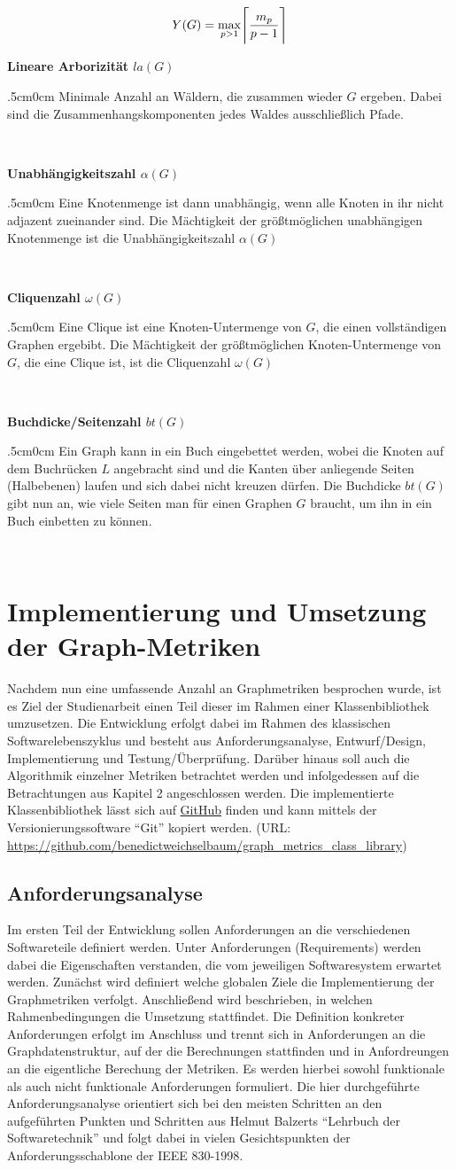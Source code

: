 \documentclass[a4paper,12pt,ngerman,chapterprefix=false,listof=totoc,bibliography=totoc]{scrreprt}
\makeatletter
\DeclarePairedDelimiter{\ceil}{\lceil}{\rceil}
\newcommand{\specialcell}[2][l]{%
  \begin{tabular}[#1]{@{}l@{}}#2\end{tabular}}
\newcommand{\metric}[2]{
	\textbf{#1}
	\begin{adjustwidth}{.5cm}{0cm}
		#2
	\end{adjustwidth}\hrulefill\\\vspace{2mm}
}
\makeatother
\begin{document}
{{{\[Y(G)=\max_{p>1}\ceil[\Bigg]{\frac{m_p}{p-1}}\]
}
\metric{Lineare Arborizität \(la(G)\)}{Minimale Anzahl an Wäldern, die zusammen wieder \(G\) ergeben. Dabei sind die Zusammenhangskomponenten jedes Waldes ausschließlich Pfade.}
\metric{Unabhängigkeitszahl \(\alpha(G)\)}{Eine Knotenmenge ist dann unabhängig, wenn alle Knoten in ihr nicht adjazent zueinander sind. Die Mächtigkeit der größtmöglichen unabhängigen Knotenmenge ist die Unabhängigkeitszahl \(\alpha(G)\)}
\metric{Cliquenzahl \(\omega(G)\)}{Eine Clique ist eine Knoten-Untermenge von \(G\), die einen vollständigen Graphen ergebibt. Die Mächtigkeit der größtmöglichen Knoten-Untermenge von \(G\), die eine Clique ist, ist die Cliquenzahl \(\omega(G)\)}
\metric{Buchdicke/Seitenzahl \(bt(G)\)}{Ein Graph kann in ein Buch eingebettet werden, wobei die Knoten auf dem Buchrücken \(L\) angebracht sind und die Kanten über anliegende Seiten (Halbebenen) laufen und sich dabei nicht kreuzen dürfen. Die Buchdicke \(bt(G)\) gibt nun an, wie viele Seiten man für einen Graphen \(G\) braucht, um ihn in ein Buch einbetten zu können.}
}
\chapter{Implementierung und Umsetzung der Graph-Metriken}
{
Nachdem nun eine umfassende Anzahl an Graphmetriken besprochen wurde, ist es Ziel der Studienarbeit einen Teil dieser im Rahmen einer Klassenbibliothek umzusetzen. Die Entwicklung erfolgt dabei im Rahmen des klassischen Softwarelebenszyklus und besteht aus Anforderungsanalyse, Entwurf/Design, Implementierung und Testung/Überprüfung. \cite{balzert_lehrbuch_2009,balzert_lehrbuch_2011} Darüber hinaus soll auch die Algorithmik einzelner Metriken betrachtet werden und infolgedessen auf die Betrachtungen aus Kapitel 2 angeschlossen werden. Die implementierte Klassenbibliothek lässt sich auf \href{https://github.com/benedictweichselbaum/graph_metrics_class_library}{GitHub} finden und kann mittels der Versionierungssoftware "`Git"' kopiert werden. (URL: \url{https://github.com/benedictweichselbaum/graph_metrics_class_library})
}
\section{Anforderungsanalyse}
{
Im ersten Teil der Entwicklung sollen Anforderungen an die verschiedenen Softwareteile definiert werden. Unter Anforderungen (Requirements) werden dabei die Eigenschaften verstanden, die vom jeweiligen Softwaresystem erwartet werden. Zunächst wird definiert welche globalen Ziele die Implementierung der Graphmetriken verfolgt. Anschließend wird beschrieben, in welchen Rahmenbedingungen die Umsetzung stattfindet. Die Definition konkreter Anforderungen erfolgt im Anschluss und trennt sich in Anforderungen an die Graphdatenstruktur, auf der die Berechnungen stattfinden und in Anfordreungen an die eigentliche Berechung der Metriken. Es werden hierbei sowohl funktionale als auch nicht funktionale Anforderungen formuliert. Die hier durchgeführte Anforderungsanalyse orientiert sich bei den meisten Schritten an den aufgeführten Punkten und Schritten aus Helmut Balzerts "`Lehrbuch der Softwaretechnik"' und folgt dabei in vielen Gesichtspunkten der Anforderungsschablone der IEEE 830-1998. \cite{balzert_lehrbuch_2009,ieee_ieee_1998}
}
}
\end{document}
